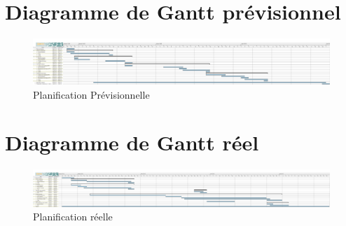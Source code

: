 \documentclass{report}
\begin{document}
\chapter{Diagramme de Gantt prévisionnel}
	\begin{figure}
		 \hspace{-4cm} 
			\includegraphics[scale=0.3]{../DiagrammePrevisionnel.png}
			\caption[Planification Prévisionnelle]{Planification Prévisionnelle}
	\end{figure}
	\medskip


\chapter{Diagramme de Gantt réel}
	\begin{figure}
		 \hspace{-4cm} 
			\includegraphics[scale=0.3]{../DiagrammeReel.png}
			\caption[Planification réelle]{Planification réelle}
	\end{figure}
	\medskip
\end{document}
